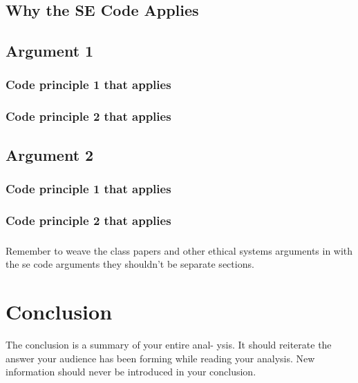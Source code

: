 \documentclass[11pt]{article}
\begin{document}
\begin{multicols}{2}
\subsection{Why the SE Code Applies}
\subsection{Argument 1}
\subsubsection{Code principle 1 that applies}
\subsubsection{Code principle 2 that applies}
\subsection{Argument 2}
\subsubsection{Code principle 1 that applies}
\subsubsection{Code principle 2 that applies}

\subsubsection*{}
Remember to weave the class papers and other ethical systems arguments in with the se code arguments they shouldn't be separate sections.

\section{Conclusion}
The conclusion is a summary of your entire anal- ysis. It should reiterate the answer your audience has been forming while reading your analysis. New information should never be introduced in your conclusion. \cite{texTemp}

\end{multicols}
\newpage

\nocite{*}




\end{document}
